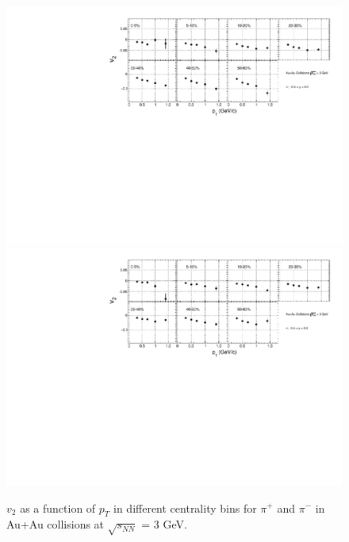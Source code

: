 \begin{figure}[h]
\includegraphics[scale=0.4]{chapter3/fig/v2ptpikp/v2pt_cent_pionp.pdf}
\includegraphics[scale=0.4]{chapter3/fig/v2ptpikp/v2pt_cent_pionm.pdf}
\caption{$v_{2}$ as a function of $p_{T}$ in different centrality bins for $\pi^{+}$ and $\pi^{-}$ in Au+Au collisions at $\sqrt{s_{NN}}$ = 3 GeV.}
\label{pion_v2pt_cent}
\end{figure}

